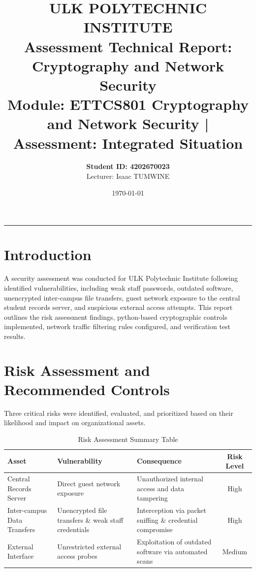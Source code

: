 \documentclass[11pt,a4paper]{article}
\title{\textbf{ULK POLYTECHNIC INSTITUTE}\\
\large Assessment Technical Report: Cryptography and Network Security\\
\small Module: ETTCS801 Cryptography and Network Security | Assessment: Integrated Situation}
\author{\textbf{Student ID: 4202670023}\\ Lecturer: Isaac TUMWINE}
\date{\today}
\begin{document}
\maketitle

\hrule
\vspace{0.5cm}

\section{Introduction}
A security assessment was conducted for ULK Polytechnic Institute following identified vulnerabilities, including weak staff passwords, outdated software, unencrypted inter-campus file transfers, guest network exposure to the central student records server, and suspicious external access attempts. This report outlines the risk assessment findings, python-based cryptographic controls implemented, network traffic filtering rules configured, and verification test results.

\section{Risk Assessment and Recommended Controls}
Three critical risks were identified, evaluated, and prioritized based on their likelihood and impact on organizational assets.

\begin{table}[h!]
\centering
\small
\begin{tabular}{p{3.2cm}p{3.8cm}p{4cm}c}
\toprule
\textbf{Asset} & \textbf{Vulnerability} & \textbf{Consequence} & \textbf{Risk Level} \\
\midrule
Central Records Server & Direct guest network exposure & Unauthorized internal access and data tampering & High \\
Inter-campus Data Transfers & Unencrypted file transfers \& weak staff credentials & Interception via packet sniffing \& credential compromise & High \\
External Interface & Unrestricted external access probes & Exploitation of outdated software via automated scans & Medium \\
\bottomrule
\end{tabular}
\caption{Risk Assessment Summary Table}
\label{tab:risk_matrix}
\end{table}
\end{document}

